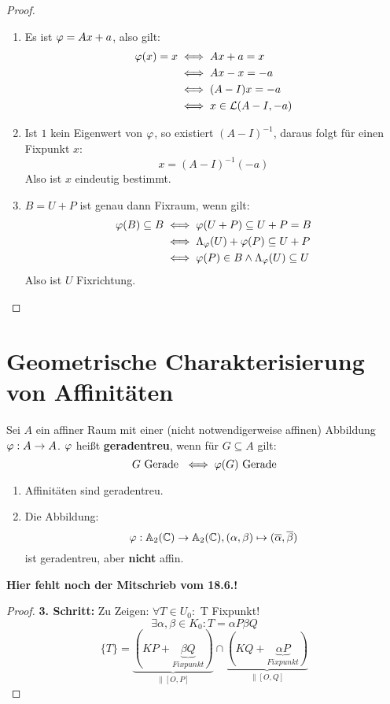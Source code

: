 \documentclass[parskip,a4paper,twoside,DIV15,BCOR12mm]{scrbook}
\begin{document}
\begin{proof}
\begin{enumerate}
\item Es ist $\varphi=Ax+a$, also gilt:
\begin{align*}
\varphi(x)=x &\iff Ax+a=x\\
&\iff Ax-x=-a\\
&\iff (A-I)x=-a\\
&\iff x\in\mathcal{L}(A-I,-a)
\end{align*}
\item Ist $1$ kein Eigenwert von $\varphi$, so existiert $(A-I)^{-1}$, daraus folgt für 
einen Fixpunkt $x$:
\[x=(A-I)^{-1}(-a)\]
Also ist $x$ eindeutig bestimmt.
\item $B=U+P$ ist genau dann Fixraum, wenn gilt:
\begin{align*}
\varphi(B)\subseteq B &\iff \varphi(U+P)\subseteq U+P=B\\
&\iff \Lambda_\varphi(U)+\varphi(P)\subseteq U+P\\
&\iff \varphi(P)\in B\wedge \Lambda_\varphi(U)\subseteq U
\end{align*}
Also ist $U$ Fixrichtung.
\end{enumerate}
\end{proof}

\section{Geometrische Charakterisierung von Affinitäten}
\begin{definition}
Sei $A$ ein affiner Raum mit einer (nicht notwendigerweise affinen) Abbildung
$\varphi:A\to A$. $\varphi$ heißt \textbf{geradentreu}, wenn für $G\subseteq A$ gilt:
\[G \text{ Gerade } \iff \varphi(G) \text{ Gerade}\]
\end{definition}

\begin{example}
\begin{enumerate}
\item Affinitäten sind geradentreu.
\item Die Abbildung:
\[\varphi:\mathbb{A}_2(\mathbb{C})\to\mathbb{A}_2(\mathbb{C}), (\alpha,\beta)\mapsto
(\overline\alpha,\overline\beta)\]
ist geradentreu, aber \textbf{nicht} affin.
\end{enumerate}
\end{example}

\textbf{\color{Red}Hier fehlt noch der Mitschrieb vom 18.6.!}

\begin{proof}
\textbf{3. Schritt:} Zu Zeigen: $\forall T\in U_0:$ T Fixpunkt!\\
\[\exists \alpha,\beta\in K_0: T=\alpha P\beta Q\]
\[\{T\}=\underbrace{(KP+\underbrace{\beta Q}_{Fixpunkt})}_{\parallel [O,P]}\cap \underbrace{(KQ+\underbrace{\alpha P}_{Fixpunkt})}_{\parallel [O,Q]}\]
\end{proof}
\end{document}
